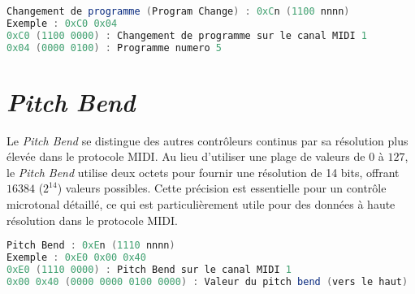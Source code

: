 \documentclass[a4paper]{report}
\begin{document}
\begin{minipage}{\linewidth}
\begin{lstlisting}[language=GLSL, caption=Changement de programme,captionpos=b,frame=single]
Changement de programme (Program Change) : 0xCn (1100 nnnn)
Exemple : 0xC0 0x04
0xC0 (1100 0000) : Changement de programme sur le canal MIDI 1
0x04 (0000 0100) : Programme numero 5
\end{lstlisting}
\end{minipage}

\section*{\textit{Pitch Bend}}

Le \textit{Pitch Bend} se distingue des autres contrôleurs continus par sa résolution plus élevée dans le protocole MIDI. Au lieu d'utiliser une plage de valeurs de $0$ à $127$, le \textit{Pitch Bend} utilise deux octets pour fournir une résolution de 14 bits, offrant $16384$ ($2^14$) valeurs possibles. Cette précision est essentielle pour un contrôle microtonal détaillé, ce qui est particulièrement utile pour des données à haute résolution dans le protocole MIDI.

\begin{minipage}{\linewidth}
\begin{lstlisting}[language=GLSL, caption=Pitch Bend,captionpos=b,frame=single]
Pitch Bend : 0xEn (1110 nnnn)
Exemple : 0xE0 0x00 0x40
0xE0 (1110 0000) : Pitch Bend sur le canal MIDI 1
0x00 0x40 (0000 0000 0100 0000) : Valeur du pitch bend (vers le haut)
\end{lstlisting}
\end{minipage}










% 







    
\end{document}
